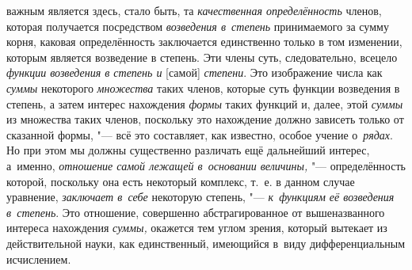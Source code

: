 важным является здесь, стало быть, та {\em качественная определённость} членов,
которая получается посредством {\em возведения в~степень} принимаемого за сумму
корня, каковая определённость заключается единственно только в том изменении,
которым является возведение в степень. Эти члены суть, следовательно, всецело
{\em функции возведения в степень и} [самой] {\em степени}. Это изображение
числа как {\em суммы} некоторого {\em множества} таких членов, которые суть
функции возведения в степень, а затем интерес нахождения {\em формы} таких
функций и, далее, этой {\em суммы} из множества таких членов, поскольку это
нахождение должно зависеть только от сказанной формы, "--- всё это составляет,
как известно, особое учение о~{\em рядах}. Но при этом мы должны существенно
различать ещё дальнейший интерес, а~именно, {\em отношение самой лежащей
в~основании величины,} "--- определённость которой, поскольку она есть
некоторый комплекс, т.~е. в данном случае уравнение, {\em заключает в~себе}
некоторую степень, "--- {\em к~функциям её возведения в~степень}. Это
отношение, совершенно абстрагированное от вышеназванного интереса нахождения
{\em суммы,} окажется тем углом зрения, который вытекает из действительной
науки, как единственный, имеющийся в~виду дифференциальным исчислением.

